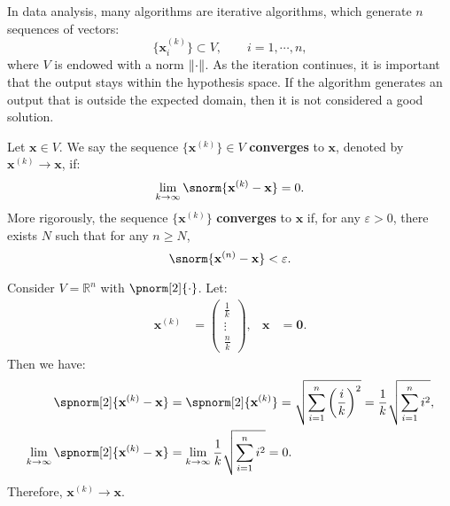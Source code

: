 \documentclass{huhtakm-template-book-v2}
\begin{document}
    In data analysis, many algorithms are iterative algorithms, which generate $n$ sequences of vectors:
    \begin{equation*}
        \{\mathbf{x}_{i}^{(k)}\} \subset V, \qquad i = 1, \cdots, n,
    \end{equation*}
    where $V$ is endowed with a norm $\lVert{\cdot}\rVert$. As the iteration continues, it is important that the output stays within the hypothesis space. If the algorithm generates an output that is outside the expected domain, then it is not considered a good solution.
    \begin{defn}
        Let $\mathbf{x} \in V$. We say the sequence $\{\mathbf{x}^{(k)}\} \in V$ \textbf{converges} to $\mathbf{x}$, denoted by $\mathbf{x}^{(k)} \to \mathbf{x}$, if:
        \begin{equation*}
            \lim_{k \to \infty}\snorm{\mathbf{x}^{(k)} - \mathbf{x}} = 0.
        \end{equation*}
        More rigorously, the sequence $\{\mathbf{x}^{(k)}\}$ \textbf{converges} to $\mathbf{x}$ if, for any $\varepsilon > 0$, there exists $N$ such that for any $n \geq N$,
        \begin{equation*}
            \snorm{\mathbf{x}^{(n)} - \mathbf{x}} < \varepsilon.
        \end{equation*}
    \end{defn}
    \begin{eg}
        Consider $V = \mathbb{R}^{n}$ with $\pnorm[2]{\cdot}$. Let:
        \begin{align*}
            \mathbf{x}^{(k)} &= \begin{pmatrix}
                \frac{1}{k}\\
                \vdots\\
                \frac{n}{k}
            \end{pmatrix}, & \mathbf{x} &= \mathbf{0}.
        \end{align*}
        Then we have:
        \begin{align*}
            \spnorm[2]{\mathbf{x}^{(k)} - \mathbf{x}} &= \spnorm[2]{\mathbf{x}^{(k)}} = \sqrt{\sum_{i=1}^{n}\left(\frac{i}{k}\right)^{2}} = \frac{1}{k}\sqrt{\sum_{i=1}^{n}i^{2}},\\
            \lim_{k \to \infty}\spnorm[2]{\mathbf{x}^{(k)} - \mathbf{x}} &= \lim_{k \to \infty}\frac{1}{k}\sqrt{\sum_{i=1}^{n}i^{2}} = 0.
        \end{align*}
        Therefore, $\mathbf{x}^{(k)} \to \mathbf{x}$.
    \end{eg}
\end{document}
